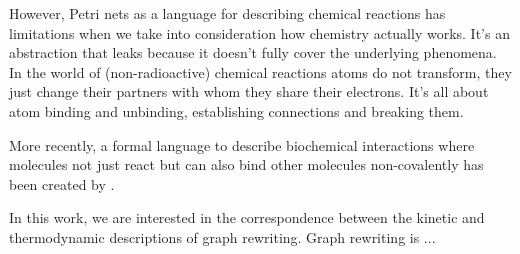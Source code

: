 However, Petri nets as a language for describing chemical reactions
has limitations when we take into consideration
how chemistry actually works.
It's an abstraction that leaks because it doesn't fully cover
the underlying phenomena.
In the world of (non-radioactive) chemical reactions
atoms do not transform,
they just change their partners with whom they share their electrons.
It's all about atom binding and unbinding,
establishing connections and breaking them.

More recently,
a formal language to describe biochemical interactions
where molecules not just react but can also bind other molecules
non-covalently has been created by . %

In this work, we are interested in the correspondence between
the kinetic and thermodynamic descriptions of graph rewriting.
Graph rewriting is ...



















